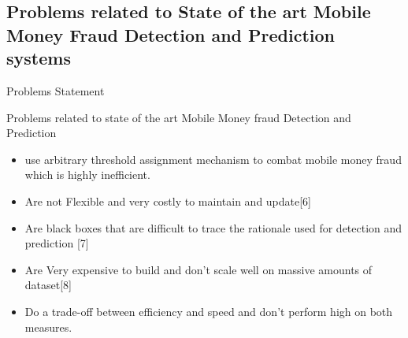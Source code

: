 \documentclass[11pt,aspectratio=169]{beamer}
\begin{document}
		\subsection{Problems related to State of the art Mobile Money Fraud Detection and Prediction systems}
		\begin{frame}{Problems Statement}
			\begin{block}{Problems related to state of the art  Mobile Money fraud Detection and Prediction}
					\small {		
					\begin{itemize}
						\item use arbitrary threshold assignment mechanism to combat mobile money fraud which is highly inefficient.
						
						\item Are not Flexible and very costly to maintain and update[6]
						
						\item Are black boxes that are difficult to trace the rationale used for detection and prediction [7]
						
						\item Are Very expensive to build and don’t scale well on massive amounts of dataset[8]
						
						\item Do a trade-off between efficiency and speed and don’t perform high on both measures.
						
					\end{itemize}
			}
			\end{block}
		\end{frame}	
	
\end{document}
